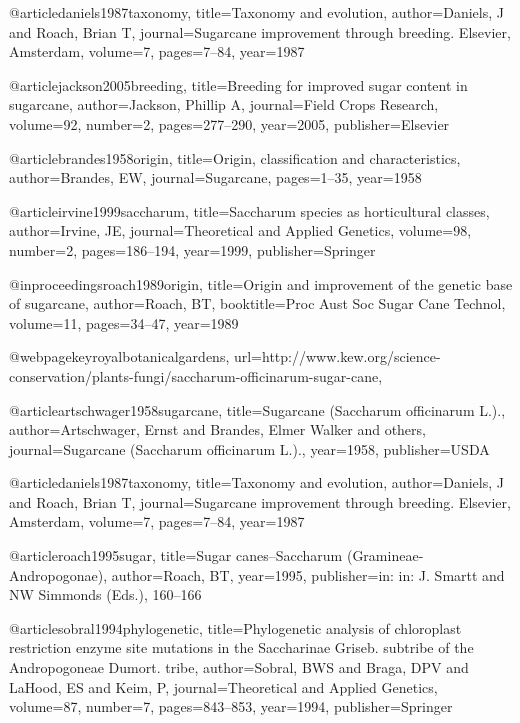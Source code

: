 {@article{daniels1987taxonomy,
  title={Taxonomy and evolution},
  author={Daniels, J and Roach, Brian T},
  journal={Sugarcane improvement through breeding. Elsevier, Amsterdam},
  volume={7},
  pages={7--84},
  year={1987}
}

@article{jackson2005breeding,
  title={Breeding for improved sugar content in sugarcane},
  author={Jackson, Phillip A},
  journal={Field Crops Research},
  volume={92},
  number={2},
  pages={277--290},
  year={2005},
  publisher={Elsevier}
}

@article{brandes1958origin,
  title={Origin, classification and characteristics},
  author={Brandes, EW},
  journal={Sugarcane},
  pages={1--35},
  year={1958}
}

@article{irvine1999saccharum,
  title={Saccharum species as horticultural classes},
  author={Irvine, JE},
  journal={Theoretical and Applied Genetics},
  volume={98},
  number={2},
  pages={186--194},
  year={1999},
  publisher={Springer}
}

@inproceedings{roach1989origin,
  title={Origin and improvement of the genetic base of sugarcane},
  author={Roach, BT},
  booktitle={Proc Aust Soc Sugar Cane Technol},
  volume={11},
  pages={34--47},
  year={1989}
}

@webpage{keyroyalbotanicalgardens},
  url={http://www.kew.org/science-conservation/plants-fungi/saccharum-officinarum-sugar-cane},
}

@article{artschwager1958sugarcane,
  title={Sugarcane (Saccharum officinarum L.).},
  author={Artschwager, Ernst and Brandes, Elmer Walker and others},
  journal={Sugarcane (Saccharum officinarum L.).},
  year={1958},
  publisher={USDA}
}

@article{daniels1987taxonomy,
  title={Taxonomy and evolution},
  author={Daniels, J and Roach, Brian T},
  journal={Sugarcane improvement through breeding. Elsevier, Amsterdam},
  volume={7},
  pages={7--84},
  year={1987}
}

@article{roach1995sugar,
  title={Sugar canes--Saccharum (Gramineae-Andropogonae)},
  author={Roach, BT},
  year={1995},
  publisher={in: in: J. Smartt and NW Simmonds (Eds.), 160--166}
}

@article{sobral1994phylogenetic,
  title={Phylogenetic analysis of chloroplast restriction enzyme site mutations in the Saccharinae Griseb. subtribe of the Andropogoneae Dumort. tribe},
  author={Sobral, BWS and Braga, DPV and LaHood, ES and Keim, P},
  journal={Theoretical and Applied Genetics},
  volume={87},
  number={7},
  pages={843--853},
  year={1994},
  publisher={Springer}
}

